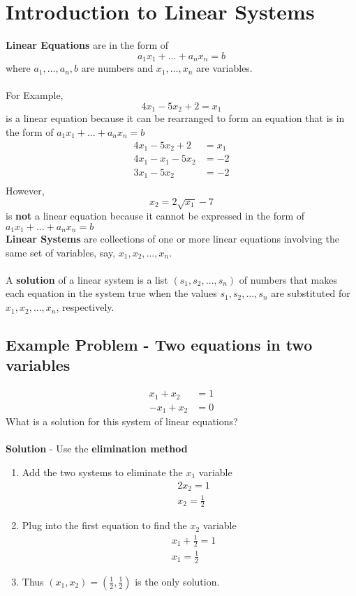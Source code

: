 \section{Introduction to Linear Systems}
\textbf{Linear Equations} are in the form of
\[
  a_{1}x_{1} + \dots + a_{n}x_{n} = b
\]
where $a_1,\dots,a_n,b$ are numbers and $x_1,\dots,x_n$ are variables. \\\\
For Example,
\[
  4x_1 - 5x_2 + 2 = x_1
\]
is a linear equation because it can be rearranged to form an equation that is in the form of $a_{1}x_{1} + \dots + a_{n}x_{n} = b$
\[
\begin{aligned}
  4x_1 - 5x_2 + 2 &= x_1 \\
  4x_1 - x_1 - 5x_2 &= -2 \\
  3x_1 - 5x_2 &= -2 \\
\end{aligned}
\]
However,
\[
  x_2 = 2\sqrt{x_1} - 7
\]
is \textbf{not} a linear equation because it cannot be expressed in the form of $a_{1}x_{1} + \dots + a_{n}x_{n} = b$ \\
\textbf{Linear Systems} are collections of one or more linear equations involving the same set of variables, say, $x_1, x_2, \dots, x_n$. \\\\
A \textbf{solution} of a linear system is a list $(s_1,s_2,\dots,s_n)$ of numbers that makes each equation in the system true when the values $s_1, s_2, \dots, s_n$ are substituted for $x_1, x_2, \dots, x_n$, respectively.
\subsection{Example Problem - Two equations in two variables}
\[
  \begin{aligned}
    x_1 + x_2 &= 1 \\
    -x_1 + x_2 &= 0
  \end{aligned}
\]
What is a solution for this system of linear equations? \\\\
\textbf{Solution} - Use the \textbf{elimination method}
\begin{enumerate}
  \item Add the two systems to eliminate the $x_1$ variable
  \[
    \begin{aligned}
      &2x_2 = 1 \\
      &x_2 = \frac{1}{2}
    \end{aligned}
  \]
  \item Plug into the first equation to find the $x_2$ variable
  \[
    \begin{aligned}
      &x_1 + \frac{1}{2} = 1 \\
      &x_1 = \frac{1}{2}
    \end{aligned}
  \]
  \item Thus $(x_1, x_2) = (\frac{1}{2},\frac{1}{2})$ is the only solution. 
\end{enumerate}
